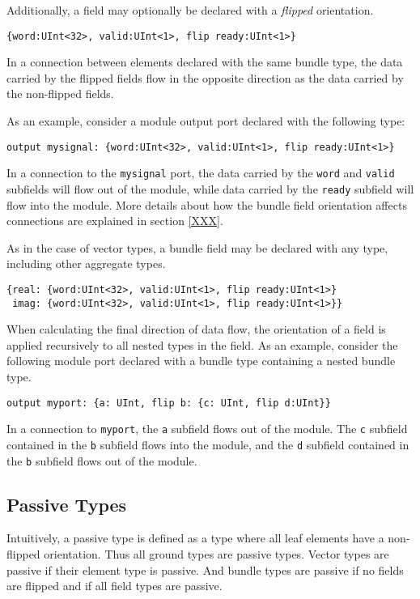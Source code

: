 \documentclass[12pt]{article}
\begin{document}
Additionally, a field may optionally be declared with a {\em flipped} orientation.
\begin{verbatim}
{word:UInt<32>, valid:UInt<1>, flip ready:UInt<1>}
\end{verbatim}
In a connection between elements declared with the same bundle type, the data carried by the flipped fields flow in the opposite direction as the data carried by the non-flipped fields.

As an example, consider a module output port declared with the following type:
\begin{verbatim}
output mysignal: {word:UInt<32>, valid:UInt<1>, flip ready:UInt<1>}
\end{verbatim}
In a connection to the \verb|mysignal| port, the data carried by the \verb|word| and \verb|valid| subfields will flow out of the module, while data carried by the \verb|ready| subfield will flow into the module. More details about how the bundle field orientation affects connections are explained in section \ref{XXX}.

As in the case of vector types, a bundle field may be declared with any type, including other aggregate types. 
\begin{verbatim}
{real: {word:UInt<32>, valid:UInt<1>, flip ready:UInt<1>}
 imag: {word:UInt<32>, valid:UInt<1>, flip ready:UInt<1>}}
\end{verbatim}

When calculating the final direction of data flow, the orientation of a field is applied recursively to all nested types in the field. As an example, consider the following module port declared with a bundle type containing a nested bundle type.
\begin{verbatim}
output myport: {a: UInt, flip b: {c: UInt, flip d:UInt}}
\end{verbatim}
In a connection to \verb|myport|, the \verb|a| subfield flows out of the module. The \verb|c| subfield contained in the \verb|b| subfield flows into the module, and the \verb|d| subfield contained in the \verb|b| subfield flows out of the module.

\subsection{Passive Types}

Intuitively, a passive type is defined as a type where all leaf elements have a non-flipped orientation. Thus all ground types are passive types. Vector types are passive if their element type is passive. And bundle types are passive if no fields are flipped and if all field types are passive.
\end{document}
